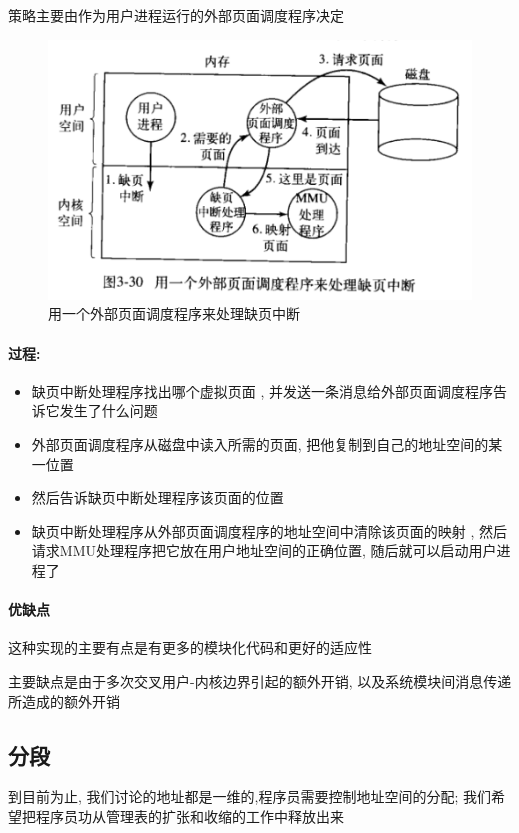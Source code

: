 \documentclass[UTF8,a4paper]{ctexart}
\begin{document}
策略主要由作为用户进程运行的外部页面调度程序决定

\begin{figure}[H]
	\centering
	\includegraphics[scale = 0.5]{assets/ModernOperatingSystems/2018-01-10-23-19-09.png}
	\caption{用一个外部页面调度程序来处理缺页中断}
\end{figure}

\paragraph{过程:}
\begin{itemize}
	\item 缺页中断处理程序找出哪个虚拟页面 , 并发送一条消息给外部页面调度程序告诉它发生了什么问题
	\item 外部页面调度程序从磁盘中读入所需的页面, 把他复制到自己的地址空间的某一位置
	\item 然后告诉缺页中断处理程序该页面的位置 
	\item 缺页中断处理程序从外部页面调度程序的地址空间中清除该页面的映射 , 然后请求MMU处理程序把它放在用户地址空间的正确位置, 随后就可以启动用户进程了
\end{itemize}

\paragraph{优缺点}
这种实现的主要有点是有更多的模块化代码和更好的适应性 

主要缺点是由于多次交叉用户-内核边界引起的额外开销, 以及系统模块间消息传递所造成的额外开销


\subsection{分段}
到目前为止, 我们讨论的地址都是一维的,程序员需要控制地址空间的分配; 我们希望把程序员功从管理表的扩张和收缩的工作中释放出来
\end{document}
